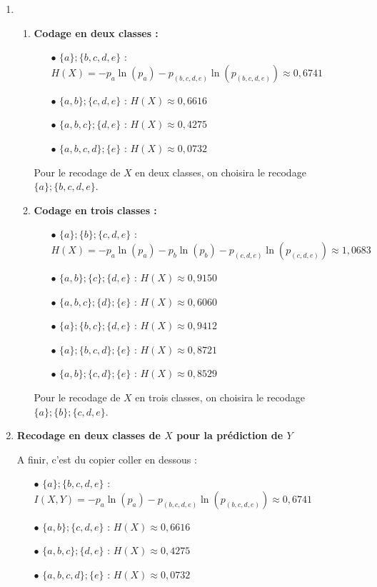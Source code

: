 \documentclass{article}
\begin{document}
\begin{enumerate}
\item 
	\begin{enumerate}
	\item \textbf{Codage en deux classes :}
		\begin{itemize}
		\item[$\bullet$] $\{a\};\{b,c,d,e\}$ : $H(X)=-p_a\ln(p_a)-p_{(b,c,d,e)}\ln(p_{(b,c,d,e)}) \approx 0,6741$
		\item[$\bullet$] $\{a,b\};\{c,d,e\}$ : $H(X) \approx 0,6616$
		\item[$\bullet$] $\{a,b,c\};\{d,e\}$ : $H(X) \approx 0,4275$
		\item[$\bullet$] $\{a,b,c,d\};\{e\}$ : $H(X) \approx 0,0732$
		\end{itemize}
Pour le recodage de $X$ en deux classes, on choisira le recodage $\{a\};\{b,c,d,e\}$.
	\item \textbf{Codage en trois classes :}
		\begin{itemize}
		\item[$\bullet$] $\{a\};\{b\};\{c,d,e\}$ : $H(X)=-p_a\ln(p_a)-p_b\ln(p_b)-p_{(c,d,e)}\ln(p_{(c,d,e)}) \approx 1,0683$
		\item[$\bullet$] $\{a,b\};\{c\};\{d,e\} $ : $H(X)\approx 0,9150$
		\item[$\bullet$] $\{a,b,c\};\{d\};\{e\} $ : $H(X)\approx 0,6060$
		\item[$\bullet$] $\{a\};\{b,c\};\{d,e\} $ : $H(X)\approx 0,9412$
		\item[$\bullet$] $\{a\};\{b,c,d\};\{e\} $ : $H(X)\approx 0,8721$
		\item[$\bullet$] $\{a,b\};\{c,d\};\{e\} $ : $H(X)\approx 0,8529$
		\end{itemize}

Pour le recodage de $X$ en trois classes, on choisira le recodage $\{a\};\{b\};\{c,d,e\}$.
	\end{enumerate}

\item \textbf{Recodage en deux classes de $X$ pour la prédiction de $Y$}

A finir, c'est du copier coller en dessous :


\begin{itemize}
		\item[$\bullet$] $\{a\};\{b,c,d,e\}$ : $I(X,Y)=-p_a\ln(p_a)-p_{(b,c,d,e)}\ln(p_{(b,c,d,e)}) \approx 0,6741$
		\item[$\bullet$] $\{a,b\};\{c,d,e\}$ : $H(X) \approx 0,6616$
		\item[$\bullet$] $\{a,b,c\};\{d,e\}$ : $H(X) \approx 0,4275$
		\item[$\bullet$] $\{a,b,c,d\};\{e\}$ : $H(X) \approx 0,0732$
		\end{itemize}
\end{enumerate}
\end{document}

